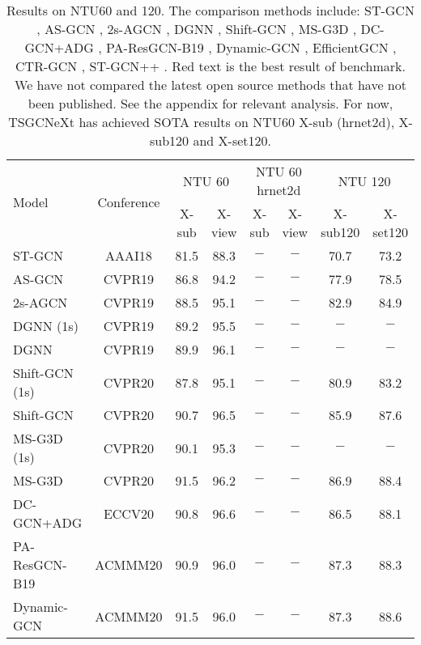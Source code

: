 \documentclass[10pt,twocolumn,letterpaper]{article}
\begin{document}
\begin{table*}[htbp]
\begin{tabular}{l|c|cc|cc}
    \bottomrule
    \end{tabular}\label{tab:bs}\end{table*} \begin{table*}
\centering
  \caption{Results on NTU60 and 120. The comparison methods include: ST-GCN \cite{yan2018spatial}, AS-GCN \cite{li2019actional}, 2s-AGCN \cite{shi2019two}, DGNN \cite{shi2019skeleton}, Shift-GCN \cite{cheng2020skeleton}, MS-G3D \cite{liu2020disentangling}, DC-GCN+ADG \cite{cheng2020decoupling}, PA-ResGCN-B19 \cite{song2020stronger}, Dynamic-GCN \cite{ye2020dynamic}, EfficientGCN \cite{song2022constructing}, CTR-GCN \cite{chen2021channel}, ST-GCN++ \cite{duan2021revisiting}. Red text is the best result of benchmark. We have not compared the latest open source methods that have not been published. See the appendix for relevant analysis. For now, TSGCNeXt has achieved SOTA results on NTU60 X-sub (hrnet2d), X-sub120 and X-set120.}
  \label{tab:allresult}
    \begin{tabular}{lc|cc|cc|cc}
    \toprule
    \multirow{2}[0]{*}{Model} & \multirow{2}[0]{*}{Conference} & \multicolumn{2}{c}{NTU 60} & \multicolumn{2}{c}{NTU 60 hrnet2d} & \multicolumn{2}{c}{NTU 120} \\
          &       & X-sub & X-view & X-sub & X-view & X-sub120 & X-set120 \\
    \midrule
ST-GCN & AAAI18 & 81.5  & 88.3  & $-$ & $-$ & 70.7  & 73.2 \\
    AS-GCN & CVPR19 & 86.8  & 94.2  & $-$ & $-$ & 77.9  & 78.5 \\
    2s-AGCN & CVPR19 & 88.5  & 95.1  & $-$ & $-$ & 82.9  & 84.9 \\
    DGNN (1s)  & CVPR19 & 89.2  & 95.5  & $-$ & $-$ & $-$ & $-$ \\
    DGNN  & CVPR19 & 89.9  & 96.1  & $-$ & $-$ & $-$ & $-$ \\
    Shift-GCN (1s) & CVPR20 & 87.8  & 95.1  & $-$ & $-$ & 80.9  & 83.2  \\
    Shift-GCN & CVPR20 & 90.7  & 96.5  & $-$ & $-$ & 85.9  & 87.6 \\
    MS-G3D (1s) & CVPR20 & 90.1  & 95.3  & $-$ & $-$ & $-$ & $-$ \\
    MS-G3D & CVPR20 & 91.5  & 96.2  & $-$ & $-$ & 86.9  & 88.4 \\
    DC-GCN+ADG & ECCV20 & 90.8  & 96.6  & $-$ & $-$ & 86.5  & 88.1 \\
    PA-ResGCN-B19 & ACMMM20 & 90.9  & 96.0   & $-$ & $-$ & 87.3  & 88.3 \\
    Dynamic-GCN & ACMMM20 & 91.5  & 96.0   & $-$ & $-$ & 87.3  & 88.6 \\

\end{tabular}
\end{table*}
\end{document}
